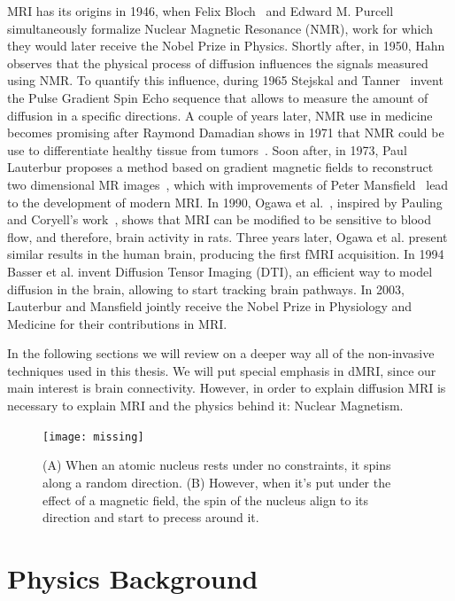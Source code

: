MRI has its origins in 1946, when Felix Bloch~\cite{Bloch1946} and Edward M.
Purcell~\cite{Purcell1946} simultaneously formalize Nuclear Magnetic Resonance
(NMR), work for which they would later receive the Nobel Prize in Physics. Shortly
after, in 1950, Hahn~\cite{Hahn1950} observes that the physical process of diffusion
influences the signals measured using NMR. To quantify this influence,
during 1965 Stejskal and Tanner~\cite{Stejskal1965} invent the Pulse Gradient
Spin Echo sequence that allows to measure the amount of diffusion in a specific
directions. A couple of years later, NMR use in medicine becomes promising after
Raymond Damadian shows in 1971 that NMR could be use to differentiate healthy
tissue from tumors~\cite{Reichson1971}. Soon after, in 1973, Paul Lauterbur
proposes a method based on gradient magnetic fields to reconstruct two
dimensional MR images~\cite{Lauterbur1973}, which with improvements of Peter
Mansfield~\cite{Mansfield1977} lead to the development of modern MRI. In 1990,
Ogawa et al.~\cite{Ogawa1993}, inspired by Pauling and Coryell's work~\cite{Pauling1936},
shows that MRI can be modified to be sensitive to blood flow, and therefore,
brain activity in rats. Three years later, Ogawa et al.\cite{Ogawa1990} present
similar results in the human brain, producing the first fMRI acquisition. In
1994 Basser et al. \cite{Basser1994} invent Diffusion Tensor Imaging (DTI), an
efficient way to model diffusion in the brain, allowing to start tracking
brain pathways. In 2003, Lauterbur and Mansfield jointly receive
the Nobel Prize in Physiology and Medicine for their contributions in MRI.

In the following sections we will review on a deeper way all of the non-invasive
techniques used in this thesis. We will put special emphasis in dMRI, since our
main interest is brain connectivity. However, in order to explain diffusion MRI
is necessary to explain MRI and the physics behind it: Nuclear Magnetism.

\begin{figure}[h]
\texttt{[image: missing]}
\caption{(A) When an atomic nucleus rests under no constraints, it spins along a
         random direction. (B) However, when it's put under the effect of a
         magnetic field, the spin of the nucleus align to its direction and
         start to precess around it.}
\label{fig:spin}
\end{figure} 

\section{Physics Background}

